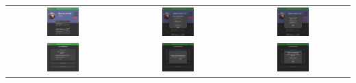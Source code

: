 \begin{tabular}{ccc}
	\includegraphics[width=0.3\textwidth]{assets/img/screenshots/7-profilo_codemonkey.png} &
	\includegraphics[width=0.3\textwidth]{assets/img/screenshots/8-proponi_collaborazione.png} &
	\includegraphics[width=0.3\textwidth]{assets/img/screenshots/9-segnala_utente.png} \\
	\includegraphics[width=0.3\textwidth]{assets/img/screenshots/10-lista_collaborazioni.png} &
	\includegraphics[width=0.3\textwidth]{assets/img/screenshots/11-accetta_rifiuta.png} &
	\includegraphics[width=0.3\textwidth]{assets/img/screenshots/12-termina.png} \\

\end{tabular}
